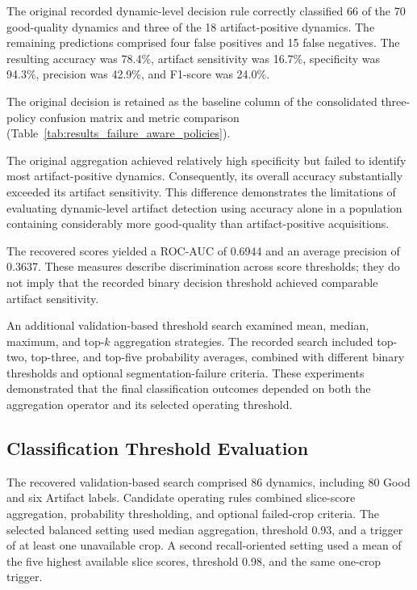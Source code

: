 The original recorded dynamic-level decision rule correctly classified 66 of the 70 good-quality dynamics and three of the 18 artifact-positive dynamics. The remaining predictions comprised four false positives and 15 false negatives. The resulting accuracy was 78.4\%, artifact sensitivity was 16.7\%, specificity was 94.3\%, precision was 42.9\%, and F1-score was 24.0\%.

The original decision is retained as the baseline column of the consolidated three-policy confusion matrix and metric comparison (Table~\ref{tab:results_failure_aware_policies}).

The original aggregation achieved relatively high specificity but failed to identify most artifact-positive dynamics. Consequently, its overall accuracy substantially exceeded its artifact sensitivity. This difference demonstrates the limitations of evaluating dynamic-level artifact detection using accuracy alone in a population containing considerably more good-quality than artifact-positive acquisitions.

The recovered scores yielded a ROC-AUC of 0.6944 and an average precision of 0.3637. These measures describe discrimination across score thresholds; they do not imply that the recorded binary decision threshold achieved comparable artifact sensitivity.

An additional validation-based threshold search examined mean, median, maximum, and top-$k$ aggregation strategies. The recorded search included top-two, top-three, and top-five probability averages, combined with different binary thresholds and optional segmentation-failure criteria. These experiments demonstrated that the final classification outcomes depended on both the aggregation operator and its selected operating threshold.


\subsection{Classification Threshold Evaluation}
\label{subsec:results_dynamic_thresholds}

The recovered validation-based search comprised 86 dynamics, including 80 Good and six Artifact labels. Candidate operating rules combined slice-score aggregation, probability thresholding, and optional failed-crop criteria. The selected balanced setting used median aggregation, threshold 0.93, and a trigger of at least one unavailable crop. A second recall-oriented setting used a mean of the five highest available slice scores, threshold 0.98, and the same one-crop trigger.

